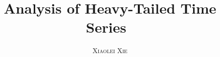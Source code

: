 







  



\title{\textbf{\HUGE Analysis of Heavy-Tailed Time Series\ \\ \vspace{1.5em}}}	
\author{\Huge \textsc{Xiaolei Xie}}
\date{}


